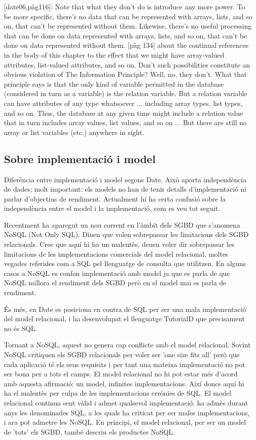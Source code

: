 [date06,pàg116]:
Note that what they don’t do is introduce any more power. To be more specific, there’s no data that can
be represented with arrays, lists, and so on, that can’t be represented without them. Likewise, there’s no
useful processing that can be done on data represented with arrays, lists, and so on, that can’t be done
on data represented without them.
[pàg 134]
about the continual references in the body of this chapter to the effect that we might have
array-valued attributes, list-valued attributes, and so on. Don’t such possibilities constitute an
obvious violation of The Information Principle?
     Well, no, they don’t. What that principle says is that the only kind of variable permitted in
the database (considered in turn as a variable) is the relation variable. But a relation variable
can have attributes of any type whatsoever ... including array types, list types, and so on.
Thus, the database at any given time might include a relation value that in turn includes array
values, list values, and so on ... But there are still no array or list variables (etc.) anywhere in sight.


\subsection{Sobre implementació i model}

Diferència entre implementació i model segons Date. Això aporta independència de dades; molt important: els models no han de tenir detalls d'implementació ni parlar d'objectius de rendiment.
Actualment hi ha certa confusió sobre la independència entre el model i la implementació, com es veu tot seguit.


Recentment ha aparegut un nou corrent en l'àmbit dels SGBD que s'anomena NoSQL (Not Only SQL). Diuen que volen sobrepassar les limitacions dels SGBD relacionals. Crec que aquí hi ha un malentès, deuen voler dir sobrepassar les limitacions de les implementacions comercials del model relacional, moltes vegades referides com a SQL pel llenguatge de consulta que utilitzen. En alguns casos a NoSQL es confon implementació amb model ja que es parla de que NoSQL millora el rendiment dels SGBD però en el model mai es parla de rendiment. 

És més, en Date es posiciona en contra de SQL per ser una mala implementació del model relacional, i ha desenvolupat el llenguatge TutorialD que precisament no és SQL. 


Tornant a NoSQL, aquest no genera cap conflicte amb el model relacional. Sovint NoSQL critiquen els SGBD relacionals per voler ser 'one size fits all' \parencite{stonebraker07,stonebraker09} però que cada aplicació té els seus requisits i per tant una mateixa implementació no pot ser bona per a tots el camps. El model relacional no hi pot estar més d'acord amb aquesta afirmació: un model, infinites implementacions. Així doncs aquí hi ha el malentès per culpa de les implementacions errònies de SQL. El model relacional continua sent vàlid i admet qualsevol implementació: ha admès durant anys les denominades SQL, a les quals ha criticat per ser males implementacions, i ara pot admetre les NoSQL. En principi, el model relacional, per ser un model de 'tots' els SGBD, també descriu els productes NoSQL.

